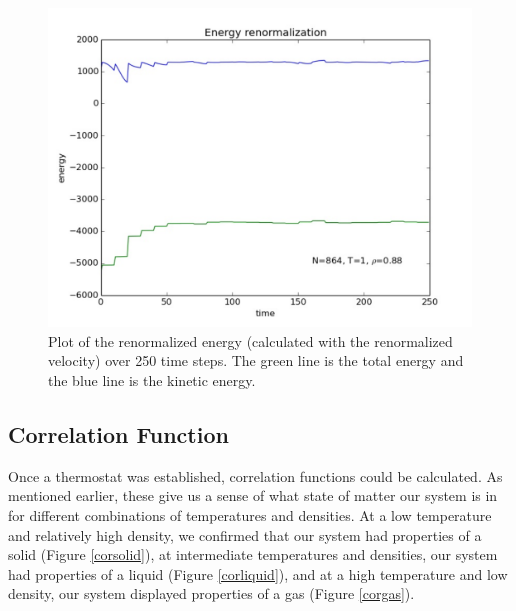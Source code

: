 \documentclass{article}
\begin{document}
\begin{multicols}{2}
\begin{figure}[H]
\begin{center}
\includegraphics[width=\linewidth]{plots/renormalizationshorttimerange.pdf}
\caption{Plot of the renormalized energy (calculated with the renormalized velocity) over 250 time steps.  The green line is the total energy and the blue line is the kinetic energy.}
\label{engrenorm}
\end{center}
\end{figure}

\subsection{Correlation Function}

Once a thermostat was established, correlation functions could be calculated.  As mentioned earlier, these give us a sense of what state of matter our system is in for different combinations of temperatures and densities.  At a low temperature and relatively high density, we confirmed that our system had properties of a solid (Figure \ref{corsolid}), at intermediate temperatures and densities, our system had properties of a liquid (Figure \ref{corliquid}), and at a high temperature and low density, our system displayed properties of a gas (Figure \ref{corgas}).  


\end{multicols}
\end{document}
